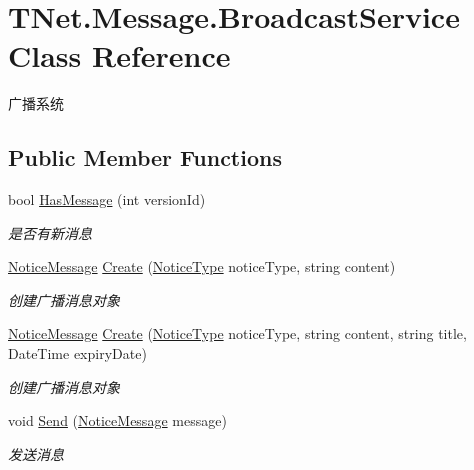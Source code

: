 \hypertarget{class_t_net_1_1_message_1_1_broadcast_service}{}\section{T\+Net.\+Message.\+Broadcast\+Service Class Reference}
\label{class_t_net_1_1_message_1_1_broadcast_service}


广播系统  


\subsection*{Public Member Functions}
\begin{DoxyCompactItemize}
\item 
bool \mbox{\hyperlink{class_t_net_1_1_message_1_1_broadcast_service_ac6632327f88046a0fd4cea4e25a5c76f}{Has\+Message}} (int version\+Id)
\begin{DoxyCompactList}\small\item\em 是否有新消息 \end{DoxyCompactList}\item 
\mbox{\hyperlink{class_t_net_1_1_message_1_1_notice_message}{Notice\+Message}} \mbox{\hyperlink{class_t_net_1_1_message_1_1_broadcast_service_a7cfb5cab46ef3ea185f756ef6f7775ae}{Create}} (\mbox{\hyperlink{namespace_t_net_1_1_model_a84a982245a4f84ccbdcd9cb3763269b6}{Notice\+Type}} notice\+Type, string content)
\begin{DoxyCompactList}\small\item\em 创建广播消息对象 \end{DoxyCompactList}\item 
\mbox{\hyperlink{class_t_net_1_1_message_1_1_notice_message}{Notice\+Message}} \mbox{\hyperlink{class_t_net_1_1_message_1_1_broadcast_service_a7edd4881d20763fd96951b8be216ba95}{Create}} (\mbox{\hyperlink{namespace_t_net_1_1_model_a84a982245a4f84ccbdcd9cb3763269b6}{Notice\+Type}} notice\+Type, string content, string title, Date\+Time expiry\+Date)
\begin{DoxyCompactList}\small\item\em 创建广播消息对象 \end{DoxyCompactList}\item 
void \mbox{\hyperlink{class_t_net_1_1_message_1_1_broadcast_service_a5ad42f9251c0a03422fce8141221c7f0}{Send}} (\mbox{\hyperlink{class_t_net_1_1_message_1_1_notice_message}{Notice\+Message}} message)
\begin{DoxyCompactList}\small\item\em 发送消息 \end{DoxyCompactList}\item 

\end{DoxyCompactItemize}
